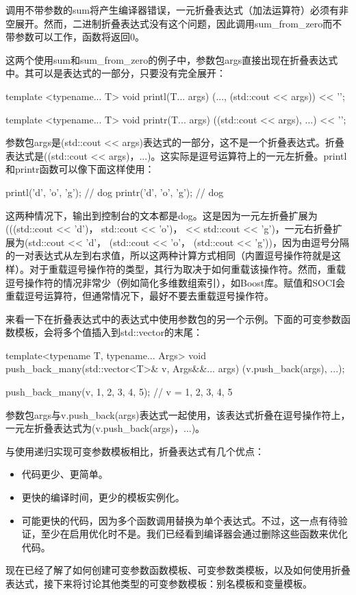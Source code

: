 调用不带参数的sum将产生编译器错误，一元折叠表达式（加法运算符）必须有非空展开。然而，二进制折叠表达式没有这个问题，因此调用sum\_from\_zero而不带参数可以工作，函数将返回0。

这两个使用sum和sum\_from\_zero的例子中，参数包args直接出现在折叠表达式中。其可以是表达式的一部分，只要没有完全展开：

\begin{cpp}
template <typename... T>
void printl(T... args)
{
	(..., (std::cout << args)) << '\n';
}

template <typename... T>
void printr(T... args)
{
	((std::cout << args), ...) << '\n';
}
\end{cpp}

参数包args是(std::cout <{}< args)表达式的一部分，这不是一个折叠表达式。折叠表达式是((std::cout <{}< args)，...)。这实际是逗号运算符上的一元左折叠。printl和printr函数可以像下面这样使用：

\begin{cpp}
printl('d', 'o', 'g'); // dog
printr('d', 'o', 'g'); // dog
\end{cpp}

这两种情况下，输出到控制台的文本都是dog。这是因为一元左折叠扩展为(((std::cout <{}< 'd')， std::cout <{}< 'o')， << std::cout <{}< 'g')，一元右折叠扩展为(std::cout <{}< 'd'， (std::cout <{}< 'o'， (std::cout <{}< 'g'))，因为由逗号分隔的一对表达式从左到右求值，所以这两种计算方式相同（内置逗号操作符就是这样）。对于重载逗号操作符的类型，其行为取决于如何重载该操作符。然而，重载逗号操作符的情况非常少（例如简化多维数组索引），如Boost库。赋值和SOCI会重载逗号运算符，但通常情况下，最好不要去重载逗号操作符。

来看一下在折叠表达式中的表达式中使用参数包的另一个示例。下面的可变参数函数模板，会将多个值插入到std::vector的末尾：

\begin{cpp}
template<typename T, typename... Args>
void push_back_many(std::vector<T>& v, Args&&... args)
{
	(v.push_back(args), ...);
}

push_back_many(v, 1, 2, 3, 4, 5); // v = {1, 2, 3, 4, 5}
\end{cpp}

参数包args与v.push\_back(args)表达式一起使用，该表达式折叠在逗号操作符上，一元左折叠表达式为(v.push\_back(args)，...)。

与使用递归实现可变参数模板相比，折叠表达式有几个优点：

\begin{itemize}
\item
代码更少、更简单。

\item
更快的编译时间，更少的模板实例化。

\item
可能更快的代码，因为多个函数调用替换为单个表达式。不过，这一点有待验证，至少在启用优化时不是。我们已经看到编译器会通过删除这些函数来优化代码。
\end{itemize}

现在已经了解了如何创建可变参数函数模板、可变参数类模板，以及如何使用折叠表达式，接下来将讨论其他类型的可变参数模板：别名模板和变量模板。




















